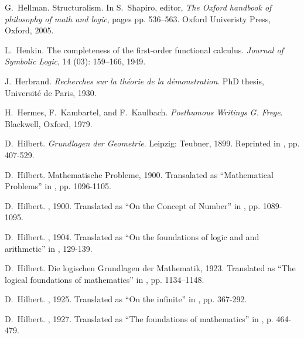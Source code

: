 \documentclass[11pt,fleqn,leqno]{article}
\begin{document}
\begin{thebibliography}{118}
G.~Hellman.
\newblock Structuralism.
\newblock In S.~Shapiro, editor, \emph{{The Oxford handbook of philosophy of
  math and logic}}, pages pp. 536--563. Oxford Univeristy Press, Oxford, 2005.

L.~Henkin.
\newblock The completeness of the first-order functional calculus.
\newblock \emph{Journal of Symbolic Logic}, 14 (03):
  159--166, 1949.

J.~Herbrand.
\newblock \emph{Recherches sur la th{\'e}orie de la d{\'e}monstration}.
\newblock PhD thesis, Universit{\'e} de Paris, 1930.

H.~Hermes, F.~Kambartel, and F.~Kaulbach.
\newblock \emph{Posthumous Writings G. Frege}.
\newblock Blackwell, Oxford, 1979.

D.~Hilbert.
\newblock \emph{{Grundlagen der Geometrie}}.
\newblock Leipzig: Teubner, 1899.
\newblock Reprinted in \citep{Hilbert2004}, pp. 407-529.

D.~Hilbert.
\newblock Mathematische {P}robleme, 1900{}.
\newblock Transalated as ``Mathematical Problems'' in \cite{Ewald1996}, pp.
  1096-1105.

D.~Hilbert.
, 1900{}.
\newblock Translated as ``On the Concept of Number'' in \citep{Ewald1996}, pp.
  1089-1095.

D.~Hilbert.
, 1904.
\newblock Translated as ``On the foundations of logic and and arithmetic'' in
  \cite{Heijenoort1967}, 129-139.

D.~Hilbert.
\newblock Die logischen {G}rundlagen der {M}athematik, 1923.
\newblock Translated as ``The logical foundations of mathematics'' in
  \cite{Ewald1996}, pp. 1134--1148.

D.~Hilbert.
, 1925.
\newblock Translated as ``On the infinite'' in \cite{Heijenoort1967}, pp.
  367-292.

D.~Hilbert.
, 1927.
\newblock Translated as ``The foundations of mathematics'' in
  \citep{Heijenoort1967}, p. 464-479.


\end{thebibliography}
\end{document}
